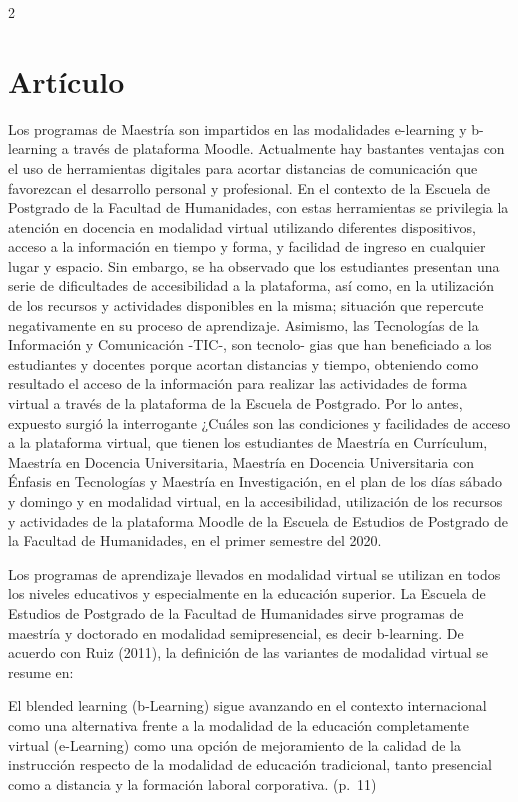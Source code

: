 \documentclass[12pt,spanish,Letterpaper,openany]{book}
\begin{document}
\begin {multicols}{2}
\hypertarget{artuxedculo-2}{%
\section{Artículo}\label{artuxedculo-2}}

Los programas de Maestría son impartidos en las modalidades e-learning y b-learning a través
de plataforma Moodle. Actualmente hay bastantes ventajas con el uso de herramientas digitales
para acortar distancias de comunicación que favorezcan el desarrollo personal y profesional. En
el contexto de la Escuela de Postgrado de la Facultad de Humanidades, con estas herramientas
se privilegia la atención en docencia en modalidad virtual utilizando diferentes dispositivos,
acceso a la información en tiempo y forma, y facilidad de ingreso en cualquier lugar y espacio.
Sin embargo, se ha observado que los estudiantes presentan una serie de dificultades de
accesibilidad a la plataforma, así como, en la utilización de los recursos y actividades disponibles
en la misma; situación que repercute negativamente en su proceso de aprendizaje. Asimismo,
las Tecnologías de la Información y Comunicación -TIC-, son tecnolo-
gias que han beneficiado a
los estudiantes y docentes porque acortan distancias y tiempo, obteniendo como resultado el
acceso de la información para realizar las actividades de forma virtual a través de la plataforma
de la Escuela de Postgrado. Por lo antes, expuesto surgió la interrogante ¿Cuáles son las condiciones
y facilidades de acceso a la plataforma virtual, que tienen los estudiantes de Maestría
en Currículum, Maestría en Docencia Universitaria, Maestría en Docencia Universitaria con
Énfasis en Tecnologías y Maestría en Investigación, en el plan de los días sábado y domingo y
en modalidad virtual, en la accesibilidad, utilización de los recursos y actividades de la plataforma
Moodle de la Escuela de Estudios de Postgrado de la Facultad de Humanidades, en el primer
semestre del 2020.

Los programas de aprendizaje llevados en modalidad virtual se utilizan en todos los niveles
educativos y especialmente en la educación superior. La Escuela de Estudios de Postgrado de
la Facultad de Humanidades sirve programas de maestría y doctorado en modalidad
semipresencial, es decir b-learning. De acuerdo con Ruiz (2011), la definición de las variantes de
modalidad virtual se resume en:

El blended learning (b-Learning) sigue avanzando en el contexto internacional como una
alternativa frente a la modalidad de la educación completamente virtual (e-Learning) como una
opción de mejoramiento de la calidad de la instrucción respecto de la modalidad de educación
tradicional, tanto presencial como a distancia y la formación laboral corporativa. (p.~11)


\end{multicols}
\end{document}
